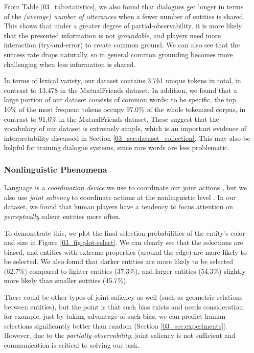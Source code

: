 From Table \ref{03_tab:statistics}, we also found that dialogues get longer in terms of the \emph{(average) number of utterances} when a fewer number of entities is shared. This shows that under a greater degree of partial-observability, it is more likely that the presented information is not \emph{groundable}, and players need more interaction (try-and-error) to create common ground. We can also see that the success rate drops naturally, so in general common grounding becomes more challenging when less information is shared.

In terms of lexical variety, our dataset contains 3,761 unique tokens in total, in contrast to 13,478 in the MutualFriends dataset. In addition, we found that a large portion of our dataset consists of common words: to be specific, the top 10\% of the most frequent tokens occupy 97.0\% of the whole tokenized corpus, in contrast to 91.6\% in the MutualFriends dataset. These suggest that the vocabulary of our dataset is extremely simple, which is an important evidence of interpretability discussed in Section \ref{03_sec:dataset_collection}. This may also be helpful for training dialogue systems, since rare words are less problematic.

\subsubsection{Nonlinguistic Phenomena}

Language is a \emph{coordination device} we use to coordinate our joint actions \citep{lewis1969convention}, but we also use \emph{joint saliency} to coordinate actions at the nonlinguistic level \citep{Schelling1960}. In our dataset, we found that human players have a tendency to focus attention on \emph{perceptually} salient entities more often.

To demonstrate this, we plot the final selection probabilities of the entity's color and size in Figure \ref{03_fig:plot-select}. We can clearly see that the selections are biased, and entities with extreme properties (around the edge) are more likely to be selected. We also found that darker entities are more likely to be selected (62.7\%) compared to lighter entities (37.3\%), and larger entities (54.3\%) slightly more likely than smaller entities (45.7\%).

There could be other types of joint saliency as well (such as geometric relations between entities), but the point is that such bias exists and needs consideration: for example, just by taking advantage of such bias, we can predict human selections significantly better than random (Section \ref{03_sec:experiments}). However, due to the \textit{partially-observability}, joint saliency is not sufficient and communication is critical to solving our task.

